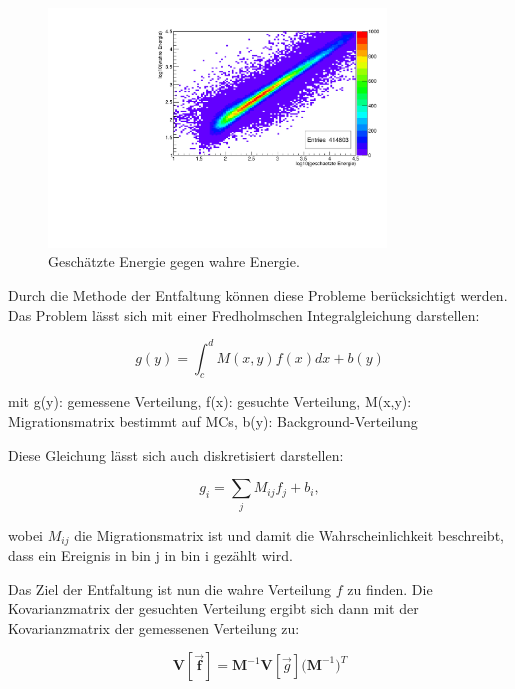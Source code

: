 \begin{figure}
    \centering
    \includegraphics[width=0.8\textwidth]{./Plots/04_MrkAnalyse/EnergyEst_EnergyTrue.pdf}
    \caption{Geschätzte Energie gegen wahre Energie.}
    \label{EnergyEst_EnergyTrue}
\end{figure}

Durch die Methode der Entfaltung können diese Probleme berücksichtigt werden. 
Das Problem lässt sich mit einer Fredholmschen Integralgleichung darstellen:

\begin{equation}
 g(y)= \int_c^d M(x,y) f(x) dx + b(y)
\end{equation}
\begin{centering}
  \small{mit g(y): gemessene Verteilung, f(x): gesuchte Verteilung, M(x,y): Migrationsmatrix bestimmt auf MCs, b(y): Background-Verteilung}
 \end{centering}

Diese Gleichung lässt sich auch diskretisiert darstellen:

\begin{equation}
 g_i=\sum_j M_{ij}f_j+b_i,
\end{equation}

wobei $M_{ij}$ die Migrationsmatrix ist und damit die Wahrscheinlichkeit beschreibt, dass ein Ereignis in bin j in bin i gezählt wird.

Das Ziel der Entfaltung ist nun die wahre Verteilung $f$ zu finden.
Die Kovarianzmatrix der gesuchten Verteilung ergibt sich dann mit der Kovarianzmatrix der gemessenen Verteilung zu:

\begin{equation}
 \mathbf{V[\vec{f}]}=\mathbf{M}^{-1}\mathbf{V}[\vec{g}]\mathbf{(M}^{-1})^T
\end{equation}

